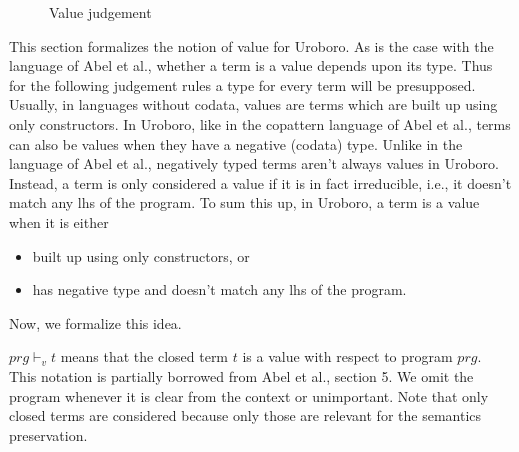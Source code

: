 \begin{figure}
\begin{prooftree}
\end{prooftree}

\begin{prooftree}
\end{prooftree}

\begin{prooftree}
\end{prooftree}
\caption{Value judgement}
\label{fig:valj}
\end{figure}

This section formalizes the notion of value for Uroboro. As is the case with the language of Abel et al.\cite{abel13copatterns}, whether a term is a value depends upon its type. Thus for the following judgement rules a type for every term will be presupposed. Usually, in languages without codata, values are terms which are built up using only constructors. In Uroboro, like in the copattern language of Abel et al., terms can also be values when they have a negative (codata) type. Unlike in the language of Abel et al., negatively typed terms aren't always values in Uroboro. Instead, a term is only considered a value if it is in fact irreducible, i.e., it doesn't match any lhs of the program. To sum this up, in Uroboro, a term is a value when it is either 
\begin{itemize}
\item built up using only constructors, or

\item has negative type and doesn't match any lhs of the program.
\end{itemize}
Now, we formalize this idea.

$prg \vdash_v t$ means that the closed term $t$ is a value with respect to program $prg$. This notation is partially borrowed from Abel et al.\cite{abel13copatterns}, section 5. We omit the program whenever it is clear from the context or unimportant. Note that only closed terms are considered because only those are relevant for the semantics preservation.

